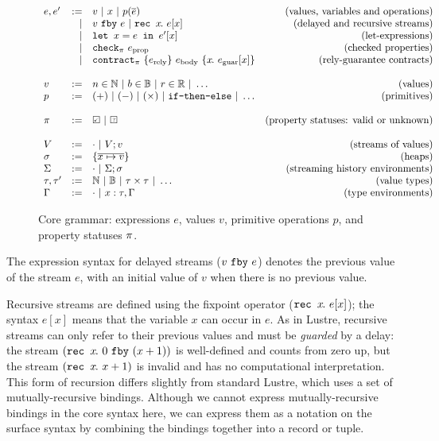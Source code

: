 \documentclass[a4paper,UKenglish,cleveref, autoref, thm-restate,anonymous]{lipics-v2021}
\begin{document}
\begin{figure}
  \[
  \begin{array}{lrlr}
    e, e' & := & v ~|~ x ~|~ p(\ov{e}) & \mbox{(values, variables and operations)} \\
          & | & \xfby{v}{e} ~|~ \xrec{x}{e[x]} & \mbox{(delayed and recursive streams)} \\ & | & \xlet{x}{e}{e'[x]} & \mbox{(let-expressions)}\\
          & | & \xcheckP{\PStatus}{e_{\text{prop}}} & \mbox{(checked properties)} \\
          & | & \xcontractP{\PStatus}{\erely}{\ebody}{\rawbind{x}{\eguar[x]}} & \mbox{(rely-guarantee contracts)} \\
\\
    v & := & n \in \mathbb{N} ~|~ b \in \mathbb{B} ~|~ r \in \mathbb{R} ~|~ \hdots  & \mbox{(values)} \\
    p & := & (+) ~|~ (-) ~|~ (\times) ~|~ \tt{if-then-else} ~|~ \hdots & \mbox{(primitives)} \\
    \\
    \PStatus & := & \PSValid ~|~ \PSUnknown & \mbox{(property statuses: valid or unknown)}\\
    \\
    V & := & \cdot ~|~ V;v & \mbox{(streams of values)} \\
    \sigma & := & \sgl{\ov{x \mapsto v}} & \mbox{(heaps)} \\
    \Sigma & := & \cdot ~|~ \Sigma;\sigma & \mbox{(streaming history environments)} \\
\tau, \tau' & := & \mathbb{N} ~|~ \mathbb{B} ~|~ \tau \times \tau ~|~ \hdots & \mbox{(value types)} \\
    \Gamma & := & \cdot ~|~ x : \tau, \Gamma & \mbox{(type environments)}  \\
    \end{array}
  \]
  \caption{Core grammar: expressions $e$, values $v$, primitive operations $p$, and property statuses $\pi$.}
  \label{f:core-grammar}
\end{figure} 
The expression syntax for delayed streams ($v~\texttt{fby}~e$) denotes the previous value of the stream $e$, with an initial value of $v$ when there is no previous value.


Recursive streams are defined using the fixpoint operator ($\texttt{rec~} x\hspace{-0.1em}.~e[x]$); the syntax $e[x]$ means that the variable $x$ can occur in $e$.
As in Lustre, recursive streams can only refer to their previous values and must be \emph{guarded} by a delay: the stream $(\texttt{rec~} x\hspace{-0.1em}.~0~\texttt{fby}~(x + 1))$ is well-defined and counts from zero up, but the stream $(\texttt{rec~} x\hspace{-0.1em}.~x + 1)$ is invalid and has no computational interpretation.
This form of recursion differs slightly from standard Lustre, which uses a set of mutually-recursive bindings.
Although we cannot express mutually-recursive bindings in the core syntax here, we can express them as a notation on the surface syntax by combining the bindings together into a record or tuple.
\end{document}
